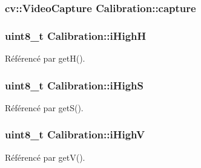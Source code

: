 \hypertarget{classCalibration_a9e0da36de8c79fd1a8f5952723f3e464}{
\subsubsection[{capture}]{\setlength{\rightskip}{0pt plus 5cm}cv\-::\-Video\-Capture Calibration\-::capture\hspace{0.3cm}{\ttfamily [private]}}}\label{classCalibration_a9e0da36de8c79fd1a8f5952723f3e464}
\hypertarget{classCalibration_a91d2ce954d66d7c5156d331f67573921}{
\subsubsection[{i\-High\-H}]{\setlength{\rightskip}{0pt plus 5cm}uint8\-\_\-t Calibration\-::i\-High\-H\hspace{0.3cm}{\ttfamily [private]}}}\label{classCalibration_a91d2ce954d66d7c5156d331f67573921}


Référencé par get\-H().

\hypertarget{classCalibration_a216315dfc878e13e9e5b0f487845a627}{
\subsubsection[{i\-High\-S}]{\setlength{\rightskip}{0pt plus 5cm}uint8\-\_\-t Calibration\-::i\-High\-S\hspace{0.3cm}{\ttfamily [private]}}}\label{classCalibration_a216315dfc878e13e9e5b0f487845a627}


Référencé par get\-S().

\hypertarget{classCalibration_ab9838bcf2d96445da4a79ccafc7aee4c}{
\subsubsection[{i\-High\-V}]{\setlength{\rightskip}{0pt plus 5cm}uint8\-\_\-t Calibration\-::i\-High\-V\hspace{0.3cm}{\ttfamily [private]}}}\label{classCalibration_ab9838bcf2d96445da4a79ccafc7aee4c}


Référencé par get\-V().

